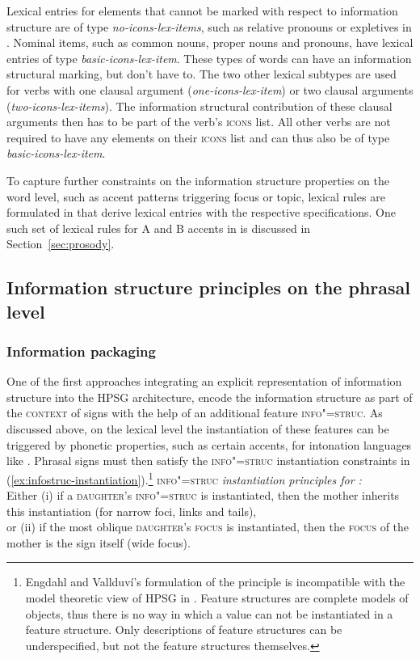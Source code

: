\documentclass[output=paper
 	        ,biblatex
                ,babelshorthands
                ,newtxmath
                ,draftmode
                ,colorlinks, citecolor=brown
]{langscibook}
\begin{document}
Lexical entries for elements that cannot be marked with respect to
information structure are of type \textit{no-icons-lex-items}, such as
relative pronouns or expletives in .  Nominal items, such as
common nouns, proper nouns and pronouns, have lexical entries of type
\textit{basic-icons-lex-item}. These types of words can have an
information structural marking, but don't have to. The two other
lexical subtypes are used for verbs with one clausal argument
(\textit{one-icons-lex-item}) or two clausal arguments
(\textit{two-icons-lex-items}). The information structural
contribution of these clausal arguments then has to be part of the
verb's \textsc{icons} list. All other verbs are not required to have any
elements on their \textsc{icons} list and can thus also be of type
\textit{basic-icons-lex-item}.

To capture further constraints on the information structure properties
on the word level, such as accent patterns triggering focus or topic,
lexical rules are formulated in \cite{song2018} that derive lexical entries with the
respective specifications. One such set of lexical rules for A and B
accents in  is discussed in Section~\ref{sec:prosody}.


\subsection{Information structure principles on the phrasal level}
\label{sec:infostruc-phrase}

\subsubsection{Information packaging \citep{EV96a}}

One of the first approaches integrating an explicit representation of
information structure into the HPSG architecture, \cite{EV96a} encode
the information structure as part of the  \textsc{context} of signs
with the help of an additional feature \textsc{info"=struc}. As
discussed above, on the lexical level the instantiation of these
features can be triggered by phonetic properties, such as certain
accents, for intonation languages like . Phrasal signs must
then satisfy the \textsc{info"=struc} instantiation constraints in
(\ref{ex:infostruc-instantiation}).\footnote{Engdahl and Vallduví’s formulation of
the principle is incompatible with the model theoretic view of HPSG in \cite{ps2}.
Feature structures are complete models of objects, thus there is no way
in which a value can not be instantiated in a feature structure. Only descriptions
of feature structures can be underspecified, but not the feature
structures themselves.}
\ea
\label{ex:infostruc-instantiation} \textsc{info"=struc} \textit{instantiation principles for :}\\
Either (i) if a \textsc{daughter}'s \textsc{info"=struc} is instantiated, then the mother inherits this instantiation (for narrow foci, links and tails),\\
or (ii) if the most oblique \textsc{daughter}'s \textsc{focus} is instantiated, then the \textsc{focus} of the mother is the sign itself (wide focus).
\z
\end{document}
